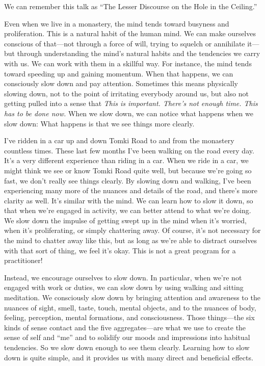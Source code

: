 We can remember this talk as ``The Lesser Discourse on the Hole in the 
Ceiling.''


Even when we live in a monastery, the mind tends toward busyness and 
proliferation. This is a natural habit of the human mind. We can make 
ourselves conscious of that---not through a force of will, trying to 
squelch or annihilate it---but through understanding the mind's natural 
habits and the tendencies we carry with us. We can work with them in a 
skillful way. For instance, the mind tends toward speeding up and 
gaining momentum. When that happens, we can consciously slow down and 
pay attention. Sometimes this means physically slowing down, not to the 
point of irritating everybody around us, but also not getting pulled 
into a sense that \emph{This is important. There's not enough time. 
This has to be done now.} When we slow down, we can notice what happens 
when we slow down: What happens is that we see things more clearly.

I've ridden in a car up and down Tomki Road to and from the monastery 
countless times. These last few months I've been walking on the road 
every day. It's a very different experience than riding in a car. When 
we ride in a car, we might think we see or know Tomki Road quite well, 
but because we're going so fast, we don't really see things clearly. By 
slowing down and walking, I've been experiencing many more of the 
nuances and details of the road, and there's more clarity as well. It's 
similar with the mind. We can learn how to slow it down, so that when 
we're engaged in activity, we can better attend to what we're doing. We 
slow down the impulse of getting swept up in the mind when it's 
worried, when it's proliferating, or simply chattering away. Of course, 
it's not necessary for the mind to chatter away like this, but as long 
as we're able to distract ourselves with that sort of thing, we feel 
it's okay. This is not a great program for a practitioner!

Instead, we encourage ourselves to slow down. In particular, when we're 
not engaged with work or duties, we can slow down by using walking and 
sitting meditation. We consciously slow down by bringing attention and 
awareness to the nuances of sight, smell, taste, touch, mental objects, 
and to the nuances of body, feeling, perception, mental formations, and 
consciousness. Those things---the six kinds of sense contact and the 
five aggregates---are what we use to create the sense of self and 
``me'' and to solidify our moods and impressions into habitual 
tendencies. So we slow down enough to see them clearly. Learning how to 
slow down is quite simple, and it provides us with many direct and 
beneficial effects.

